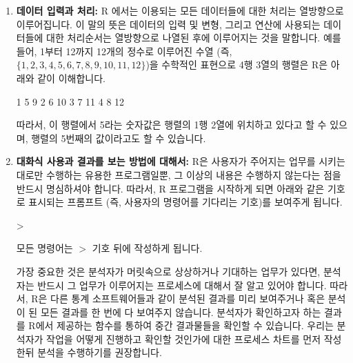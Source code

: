 \documentclass{book}
\begin{document}
\begin{enumerate}
  \item  \textbf{데이터 입력과 처리:}  R 에서는 이용되는 모든 데이터들에 대한 처리는 열방향으로 이루어집니다.
이 말의 뜻은 데이터의 입력 및 변형, 그리고 연산에 사용되는 데이터들에 대한 처리순서는 열방향으로 나열된 후에 이루어지는 것을 말합니다. 
예를들어, 1부터 12까지 12개의 정수로 이루어진 수열 (즉, $\{ 1, 2, 3, 4, 5, 6, 7, 8, 9, 10, 11, 12 \}$)을 수학적인 표현으로 4행 3열의 행렬은 R은 아래와 같이 이해합니다. 



\begin{Schunk}
\begin{Soutput}
1  5   9
2  6  10
3  7  11
4  8  12
\end{Soutput}
\end{Schunk}

따라서, 이 행렬에서 5라는 숫자값은 행렬의 1행 2열에 위치하고 있다고 할 수 있으며, 행렬의 5번째의 값이라고도 할 수 있습니다. 

  \item  \textbf{대화식 사용과 결과를 보는 방법에 대해서:} R은 사용자가 주어지는 업무를 시키는 대로만 수행하는 유용한 프로그램일뿐, 그 이상의 내용은 수행하지 않는다는 점을 반드시 명심하셔야 합니다. 
따라서, R 프로그램을 시작하게 되면 아래와 같은 기호로 표시되는 프롬프트 (즉, 사용자의 명령어를 기다리는 기호)를 보여주게 됩니다. 
\begin{Schunk}
\begin{Soutput}
>
\end{Soutput}
\end{Schunk}

모든 명령어는 $>$ 기호 뒤에 작성하게 됩니다. 

가장 중요한 것은 분석자가 머릿속으로 상상하거나 기대하는 업무가 있다면, 분석자는 반드시 그 업무가 이루어지는 프로세스에 대해서 잘 알고 있어야 합니다.
따라서, R은 다른 통계 소프트웨어들과 같이 분석된 결과를 미리 보여주거나 혹은 분석이 된 모든 결과를 한 번에 다 보여주지 않습니다.
분석자가 확인하고자 하는 결과를 R에서 제공하는 함수를 통하여 중간 결과물들을 확인할 수 있습니다. 
우리는 분석자가 작업을 어떻게 진행하고 확인할 것인가에 대한 프로세스 차트를 먼저 작성한뒤 분석을 수행하기를 권장합니다.



\end{enumerate}
\end{document}
